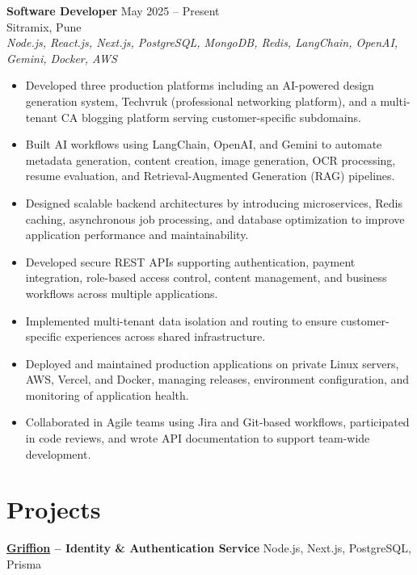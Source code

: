 \documentclass[a4paper,10pt]{article}
\begin{document}
\textbf{Software Developer} \hfill May 2025 -- Present\\
Sitramix, Pune\\
\textit{Node.js, React.js, Next.js, PostgreSQL, MongoDB, Redis, LangChain, OpenAI, Gemini, Docker, AWS}

\begin{itemize}[leftmargin=*]
    \item Developed three production platforms including an AI-powered design generation system, Techvruk (professional networking platform), and a multi-tenant CA blogging platform serving customer-specific subdomains.
    \item Built AI workflows using LangChain, OpenAI, and Gemini to automate metadata generation, content creation, image generation, OCR processing, resume evaluation, and Retrieval-Augmented Generation (RAG) pipelines.
    \item Designed scalable backend architectures by introducing microservices, Redis caching, asynchronous job processing, and database optimization to improve application performance and maintainability.
    \item Developed secure REST APIs supporting authentication, payment integration, role-based access control, content management, and business workflows across multiple applications.
    \item Implemented multi-tenant data isolation and routing to ensure customer-specific experiences across shared infrastructure.
    \item Deployed and maintained production applications on private Linux servers, AWS, Vercel, and Docker, managing releases, environment configuration, and monitoring of application health.
    \item Collaborated in Agile teams using Jira and Git-based workflows, participated in code reviews, and wrote API documentation to support team-wide development.
\end{itemize}

\section*{Projects}

\textbf{\href{https://github.com/ShivSarwade/Griffion}{Griffion} -- Identity \& Authentication Service} \hfill Node.js, Next.js, PostgreSQL, Prisma
\end{document}
